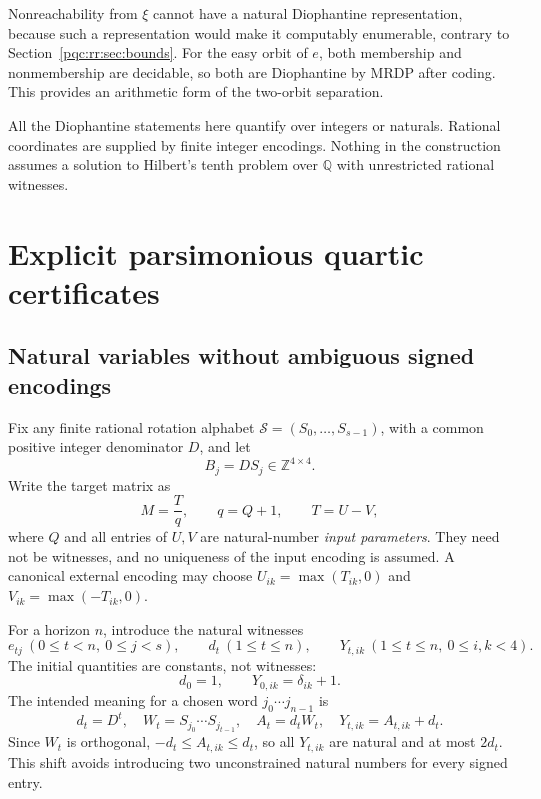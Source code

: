 \documentclass[11pt,letterpaper]{article}
\numberwithin{equation}{section}
\theoremstyle{definition}
\theoremstyle{remark}
\newcommand{\Z}{\mathbb Z}
\newcommand{\Q}{\mathbb Q}
\newcommand{\srcmark}[1]{\par\noindent{\small\itshape [source~#1]}\par}
\begin{document}
Nonreachability from $\xi$ cannot have a natural Diophantine representation,
because such a representation would make it computably enumerable,
contrary to Section~\ref{pqc:rr:sec:bounds}. For the easy orbit of $e$, both
membership and nonmembership are decidable, so both are Diophantine by
MRDP after coding. This provides an arithmetic form of the two-orbit
separation.

All the Diophantine statements here quantify over integers or naturals.
Rational coordinates are supplied by finite integer encodings. Nothing
in the construction assumes a solution to Hilbert's tenth problem over
$\Q$ with unrestricted rational witnesses.
\section{Explicit parsimonious quartic certificates}
\label{pqc:dr:sec:certificates}
\srcmark{16}

\subsection{Natural variables without ambiguous signed encodings}
Fix any finite rational rotation alphabet
$\mathcal S=(S_0,\ldots,S_{s-1})$, with a common positive integer
denominator $D$, and let
\[
 B_j=DS_j\in\Z^{4\times4}.
\]
Write the target matrix as
\begin{equation}
 M=\frac{T}{q},\qquad q=Q+1,\qquad T=U-V,
 \label{pqc:dr:eq:targetparameters}
\end{equation}
where $Q$ and all entries of $U,V$ are natural-number \emph{input
parameters}. They need not be witnesses, and no uniqueness of the
input encoding is assumed. A canonical external encoding may choose
$U_{ik}=\max(T_{ik},0)$ and $V_{ik}=\max(-T_{ik},0)$.

For a horizon $n$, introduce the natural witnesses
\[
 e_{tj}\ (0\leq t<n,\ 0\leq j<s),\qquad
 d_t\ (1\leq t\leq n),\qquad
 Y_{t,ik}\ (1\leq t\leq n,\ 0\leq i,k<4).
\]
The initial quantities are constants, not witnesses:
\begin{equation}
 d_0=1,\qquad Y_{0,ik}=\delta_{ik}+1.
 \label{pqc:dr:eq:initial}
\end{equation}
The intended meaning for a chosen word $j_0\cdots j_{n-1}$ is
\begin{equation}
 d_t=D^t,\quad W_t=S_{j_0}\cdots S_{j_{t-1}},\quad
 A_t=d_tW_t,\quad Y_{t,ik}=A_{t,ik}+d_t.
 \label{pqc:dr:eq:meaning}
\end{equation}
Since $W_t$ is orthogonal, $-d_t\leq A_{t,ik}\leq d_t$, so all
$Y_{t,ik}$ are natural and at most $2d_t$. This shift avoids introducing
two unconstrained natural numbers for every signed entry.
\end{document}

